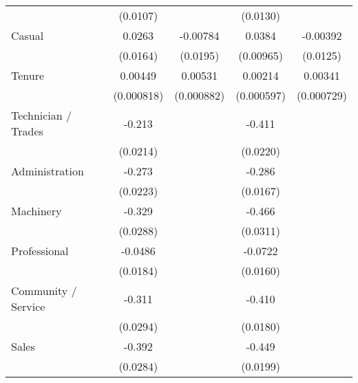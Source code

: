 {\begin{tabular}{l*{4}{c}}
                    &    (0.0107)         &                     &    (0.0130)         &                     \\
[1em]
Casual              &      0.0263         &    -0.00784         &      0.0384\sym{***}&    -0.00392         \\
                    &    (0.0164)         &    (0.0195)         &   (0.00965)         &    (0.0125)         \\
[1em]
Tenure              &     0.00449\sym{***}&     0.00531\sym{***}&     0.00214\sym{***}&     0.00341\sym{***}\\
                    &  (0.000818)         &  (0.000882)         &  (0.000597)         &  (0.000729)         \\
[1em]
Technician / Trades &      -0.213\sym{***}&                     &      -0.411\sym{***}&                     \\
                    &    (0.0214)         &                     &    (0.0220)         &                     \\
[1em]
Administration      &      -0.273\sym{***}&                     &      -0.286\sym{***}&                     \\
                    &    (0.0223)         &                     &    (0.0167)         &                     \\
[1em]
Machinery           &      -0.329\sym{***}&                     &      -0.466\sym{***}&                     \\
                    &    (0.0288)         &                     &    (0.0311)         &                     \\
[1em]
Professional        &     -0.0486\sym{**} &                     &     -0.0722\sym{***}&                     \\
                    &    (0.0184)         &                     &    (0.0160)         &                     \\
[1em]
Community / Service &      -0.311\sym{***}&                     &      -0.410\sym{***}&                     \\
                    &    (0.0294)         &                     &    (0.0180)         &                     \\
[1em]
Sales               &      -0.392\sym{***}&                     &      -0.449\sym{***}&                     \\
                    &    (0.0284)         &                     &    (0.0199)         &                     \\

\end{tabular}}

